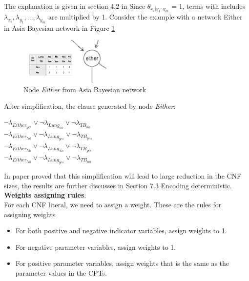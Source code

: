         \noindent The explanation is given in section 4.2 in \cite{enc1} 
        Since $\theta_{x_{i}|y_{1}..y_{m}}$ = 1, terms with includes $\lambda_{x_{i}}, \lambda_{y_{1}}, ..., \lambda_{y_{m}}$ are multiplied by 1. 
        Consider the example with a network Either in Asia Bayesian network in Figure \ref{fig:either01}
        
        \begin{figure}[h]
            \centering
            \includegraphics[width=0.4\textwidth]{pic/either01s.png}
            \caption{Node \textit{Either} from Asia Bayesian network}
            \label{fig:either01}
        \end{figure}
        
        \noindent After simplification, the clause generated by node \textit{Either}:\\
        \begin{center}
            $\neg \lambda_{Either_{yes}} \vee \neg \lambda_{Lung_{no}} \vee \neg  \lambda_{TB_{no}} $\\
            $\neg \lambda_{Either_{No}} \vee \neg \lambda_{Lung_{yes}} \vee \neg \lambda_{TB_{yes}}$\\
            $\neg \lambda_{Either_{No}} \vee \neg \lambda_{Lung_{No}} \vee \neg  \lambda_{TB_{yes}}$\\
            $\neg  \lambda_{Either_{No}} \vee \neg  \lambda_{Lung_{yes}} \vee \neg  \lambda_{TB_{no}}$
        \end{center}
        
        \noindent In paper \cite{enc2} proved that this simplification will lead to large reduction in the CNF sizes, the results are further discusses in Section 7.3 Encoding deterministic.\\
        
        \noindent \textbf{Weights assigning rules}:\\
        
        \noindent For each CNF literal, we need to assign a weight. These are the rules for assigning weights
        \begin{itemize}
            \item For both positive and negative indicator variables, assign weights to 1.
            \item For negative parameter variables, assign weights to 1.
            \item For positive parameter variables, assign weights that is the same as the parameter values in the CPTs.
        \end{itemize}
       
